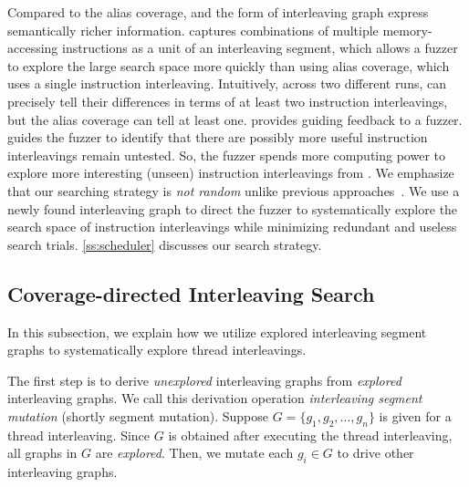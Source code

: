 %
%
Compared to the alias coverage, \intcov and the form of interleaving graph
express semantically richer information. \Intcov captures combinations 
of multiple memory-accessing instructions as a unit of an interleaving segment, which allows a fuzzer to explore the large search space more quickly than using alias coverage, which uses a single instruction interleaving. Intuitively, across two different runs, \intcov can precisely tell 
their differences in terms of at least two instruction interleavings, 
but the alias coverage can tell at least one.
\Intcov provides guiding feedback to a fuzzer.
\Intcov guides the fuzzer to identify that there are possibly more useful instruction interleavings remain untested. So, the fuzzer spends
more computing power to explore more interesting (unseen) instruction interleavings from \intcov. We emphasize that our searching strategy is 
\textit{not random} unlike previous approaches~\cite{krace, ski, pctalgorithm, muzz}.
%
We use a newly found interleaving graph to
direct the fuzzer to systematically explore the search space of
instruction interleavings while minimizing redundant and useless
search trials. \autoref{ss:scheduler} discusses our search strategy.


\subsection{Coverage-directed Interleaving Search}
\label{ss:scheduler}
%
In this subsection, we explain how we utilize explored interleaving
segment graphs to systematically explore thread interleavings.

%
The first step is to derive \textit{unexplored} interleaving graphs
from \textit{explored} interleaving graphs. We call this derivation
operation \textit{interleaving segment mutation} (shortly segment
mutation).
%
Suppose $G = \{g_1, g_2, ..., g_n \}$ is given for a thread
interleaving. Since $G$ is obtained after executing the thread
interleaving, all graphs in $G$ are \textit{explored}.
%
Then, we mutate each $g_i \in G$ to drive other interleaving graphs.



